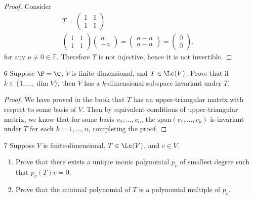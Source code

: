 \documentclass{extarticle}
\begin{document}
\begin{proof}
    Consider 
\begin{gather*}
    T =
    \begin{pmatrix}
        1 & 1 \\ 
        1 & 1
    \end{pmatrix} \\ 
    \begin{pmatrix}
        1 & 1 \\ 
        1 & 1
    \end{pmatrix}
    \begin{pmatrix}
        a \\ 
        - a
    \end{pmatrix} = 
    \begin{pmatrix}
        a -a \\ 
        a -a
    \end{pmatrix} = 
    \begin{pmatrix}
        0 \\ 
        0
    \end{pmatrix},
\end{gather*}
for any $ a \ne 0 \in \mathbb{F} $. Therefore $ T $ is not injective, hence
it is not invertible.
\end{proof}

\begin{problem}{6}
    Suppose \(\F = \C\), \(V\) is finite-dimensional, and \(T \in \Lc(V)\). Prove that if 
    \(k \in \{1, \ldots, \dim V\}\), then \(V\) has a \(k\)-dimensional subspace 
    invariant under \(T\).
\end{problem}

\begin{proof}
We have proved in the book that \(T\) has an upper-triangular matrix with respect to some basis 
of \(V\). Then by equivalent conditions of upper-triangular matrix, we know that for some basis 
\(v_1, \ldots, v_n\), the \(\text{span}(v_1, \ldots, v_k)\) is invariant under \(T\) for each 
\(k = 1, \ldots, n\), completing the proof. 
\end{proof}

\begin{problem}{7}
    Suppose \(V\) is finite-dimensional, \(T \in \Lc(V)\), and \(v \in V\). 
    \begin{enumerate}[label=(\alph*)]
        \item Prove that there exists a unique monic polynomial \(p_v\) of smallest degree such that 
        \(p_v(T)v = 0\).
        \item Prove that the minimal polynomial of \(T\) is a polynomial multiple of \(p_v\).
    \end{enumerate}
\end{problem}
\end{document}
